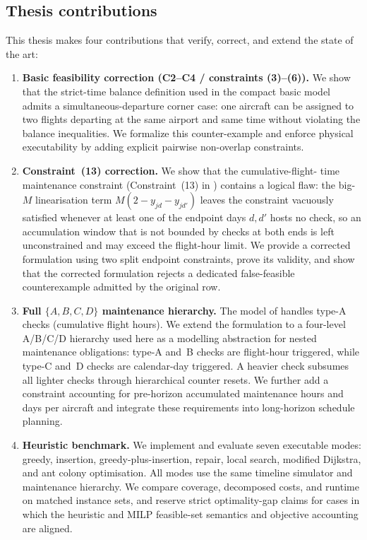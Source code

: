 \subsection*{Thesis contributions}

This thesis makes four contributions that verify, correct, and extend the
state of the art:

\begin{enumerate}
\item \textbf{Basic feasibility correction (C2--C4 / constraints (3)--(6)).}
  We show that the strict-time balance definition used in the compact basic
  model admits a simultaneous-departure corner case: one aircraft can be
  assigned to two flights departing at the same airport and same time without
  violating the balance inequalities.  We formalize this counter-example and
  enforce physical executability by adding explicit pairwise non-overlap
  constraints.

\item \textbf{Constraint~(13) correction.}  We show that the cumulative-flight-
  time maintenance constraint (Constraint~(13) in \citet{khaled2018compact})
  contains a logical flaw: the big-$M$ linearisation term $M(2 - y_{jd} -
  y_{jd'})$ leaves the constraint vacuously satisfied whenever at least one of
  the endpoint days $d, d'$ hosts no check, so an accumulation window that is
  not bounded by checks at both ends is left unconstrained and may exceed the
  flight-hour limit.  We provide a corrected formulation using two split
  endpoint constraints, prove its validity, and show that the corrected
  formulation rejects a dedicated false-feasible counterexample admitted by
  the original row.

\item \textbf{Full $\{A, B, C, D\}$ maintenance hierarchy.}  The model of
  \citet{khaled2018compact} handles type-A checks (cumulative flight hours).
  We extend the formulation to a four-level A/B/C/D hierarchy used here as a
  modelling abstraction for nested maintenance obligations: type-A and~B
  checks are flight-hour triggered, while type-C and~D checks are calendar-day
  triggered. A heavier check subsumes all lighter checks through hierarchical
  counter resets. We further add a constraint accounting for pre-horizon
  accumulated maintenance hours and days per aircraft and integrate these
  requirements into long-horizon schedule planning.

\item \textbf{Heuristic benchmark.}  We implement and evaluate seven
  executable modes: greedy, insertion, greedy-plus-insertion, repair, local
  search, modified Dijkstra, and ant colony optimisation. All modes use the
  same timeline simulator and maintenance hierarchy. We compare coverage,
  decomposed costs, and runtime on matched instance sets, and reserve strict
  optimality-gap claims for cases in which the heuristic and MILP feasible-set
  semantics and objective accounting are aligned.
\end{enumerate}

